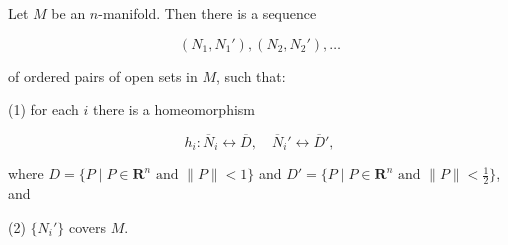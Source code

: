 Let $M$ be an $n$-manifold. Then there is a sequence

$$(N_1, N_1'), (N_2, N_2'), \dots$$

of ordered pairs of open sets in $M$, such that:

(1) for each $i$ there is a homeomorphism

$$h_i: \overline{N}_i \leftrightarrow \overline{D}, \quad \overline{N}_i' \leftrightarrow \overline{D}',$$

where $D = \{ P \mid P \in \mathbf{R}^n \text{ and } \|P\| < 1 \}$ and $D' = \{ P \mid P \in \mathbf{R}^n \text{ and } \|P\| < \tfrac{1}{2} \}$, and

(2) $\{N_i'\}$ covers $M$.
